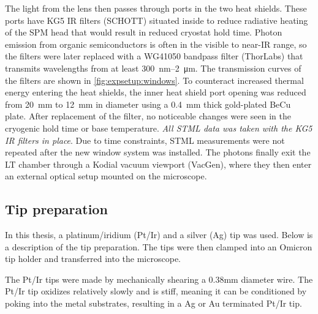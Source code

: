 The light from the lens then passes through ports in the two heat shields. These ports have KG5 \ac{IR} filters (SCHOTT) situated inside to reduce radiative heating of the \ac{SPM} head that would result in reduced cryostat hold time. Photon emission from organic semiconductors is often in the visible to near-\ac{IR} range, so the filters were later replaced with a WG41050 bandpass filter  (ThorLabs) that transmits wavelengths from at least \SI{300}{nm}--\SI{2}{\micro m}. The transmission curves of the filters are shown in \autoref{fig:expsetup:windows}. To counteract increased thermal energy entering the heat shields, the inner heat shield port opening was reduced from \SI{20}{mm} to \SI{12}{mm} in diameter using a \SI{0.4}{mm} thick gold-plated BeCu plate. After replacement of the filter, no noticeable changes were seen in the cryogenic hold time or base temperature. \emph{All \ac{STML} data was taken with the KG5 \ac{IR} filters in place}. Due to time constraints, \ac{STML} measurements were not repeated after the new window system was installed. The photons finally exit the \ac{LT} chamber through a Kodial vacuum viewport (VacGen), where they then enter an external optical setup mounted on the microscope. 



\subsection{Tip preparation}
\label{sec:expsetup:tip_prep}

In this thesis, a platinum/iridium (Pt/Ir) and a silver (Ag) tip was used. Below is a description of the tip preparation. The tips were then clamped into an Omicron tip holder and transferred into the microscope. 

The Pt/Ir tips were made by mechanically shearing a 0.38mm diameter wire. The Pt/Ir tip oxidizes relatively slowly and is stiff, meaning it can be conditioned by poking into the metal substrates, resulting in a Ag or Au terminated Pt/Ir tip. 


